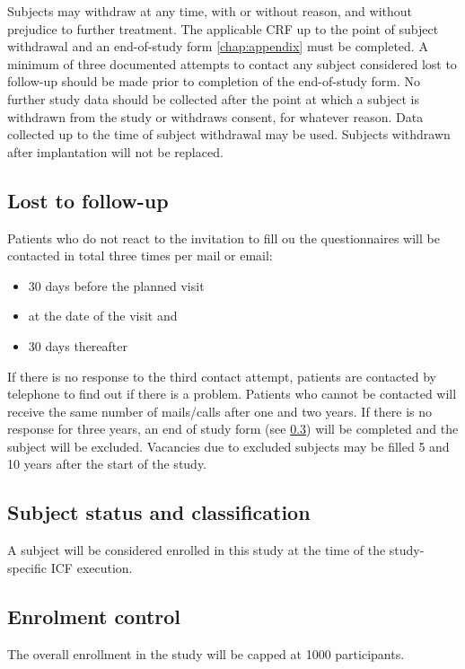 Subjects may withdraw at any time, with or without reason, and without prejudice to further treatment. The applicable \ac{CRF} up to the point of subject withdrawal and an end-of-study form \ref{chap:appendix} must be completed. A minimum of three documented attempts to contact any subject considered lost to follow-up should be made prior to completion of the end-of-study form. No further study data should be collected after the point at which a subject is withdrawn from the study or withdraws consent, for whatever reason. Data collected up to the time of subject withdrawal may be used. Subjects withdrawn after implantation will not be replaced.


\subsection{Lost to follow-up}
Patients who do not react to the invitation to fill ou the questionnaires will be contacted in total three times per mail or email:
\begin{itemize}
\item 30 days before the planned visit
\item at the date of the visit and
\item 30 days thereafter
\end{itemize}
If there is no response to the third contact attempt, patients are contacted by telephone to find out if there is a problem. Patients who cannot be contacted will receive the same number of mails/calls after one and two years. If there is no response for three years, an end of study form (see \ref{}) will be completed and the subject will be excluded. Vacancies due to excluded subjects may be filled 5 and 10 years after the start of the study.


\subsection{Subject status and classification}
A subject will be considered enrolled in this study at the time of the study-specific \ac{ICF} execution.

\subsection{Enrolment control}
The overall enrollment in the study will be capped at \num[round-precision = 0, round-mode = places]{1000} participants.

